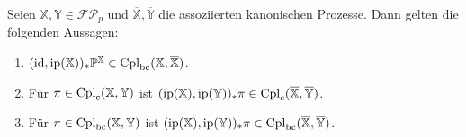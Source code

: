 \begin{lemma}
Seien $\mathbb{X}, \mathbb{Y} \in \mathcal{FP}_p$ und $\overline{\mathbb{X}}, \overline{\mathbb{Y}}$ die assoziierten kanonischen Prozesse. Dann gelten die folgenden Aussagen:
\begin{enumerate}
\item $(\operatorname{id}, \operatorname{ip}(\mathbb{X}))_*\mathbb{P}^\mathbb{X} \in \operatorname{Cpl}_{\operatorname{bc}}(\mathbb{X}, \overline{\mathbb{X}})$.
\item Für $\pi \in \operatorname{Cpl}_{\operatorname{c}}(\mathbb{X}, \mathbb{Y})$ ist $(\operatorname{ip}(\mathbb{X}), \operatorname{ip}(\mathbb{Y}))_* \pi \in \operatorname{Cpl}_{\operatorname{c}}(\overline{\mathbb{X}}, \overline{\mathbb{Y}})$.
\item Für $\pi \in \operatorname{Cpl}_{\operatorname{bc}}(\mathbb{X}, \mathbb{Y})$ ist $(\operatorname{ip}(\mathbb{X}), \operatorname{ip}(\mathbb{Y}))_* \pi \in \operatorname{Cpl}_{\operatorname{bc}}(\overline{\mathbb{X}}, \overline{\mathbb{Y}})$.
\end{enumerate}
\end{lemma}
